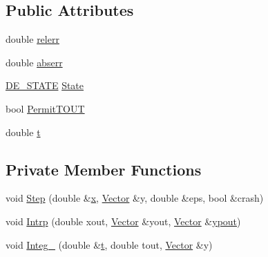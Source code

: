 \subsection*{Public Attributes}
\begin{DoxyCompactItemize}
\item 
double \hyperlink{classDE_a877edbd8bd4ba297b5602786b552059f}{relerr}
\item 
double \hyperlink{classDE_a9337b177c5adfeda779ceecd6b56b370}{abserr}
\item 
\hyperlink{SAT__DE_8h_a57a5a4efb7b7add9bd828d85d9bb920d}{D\-E\-\_\-\-S\-T\-A\-T\-E} \hyperlink{classDE_a1d99a54650b09e8192bf89537f66bed2}{State}
\item 
bool \hyperlink{classDE_ab4adac8a112f4c5b5600986b418e5129}{Permit\-T\-O\-U\-T}
\item 
double \hyperlink{classDE_a56ee5af65170db9321a5508c207cd173}{t}
\end{DoxyCompactItemize}
\subsection*{Private Member Functions}
\begin{DoxyCompactItemize}
\item 
void \hyperlink{classDE_ac45486f7c7bf422c6bd024aba501a2a2}{Step} (double \&\hyperlink{classDE_a53686f8f7ab89225ba80835e910168fa}{x}, \hyperlink{classVector}{Vector} \&y, double \&eps, bool \&crash)
\item 
void \hyperlink{classDE_a6437bef70b2bb04c1b041e6ea86665ad}{Intrp} (double xout, \hyperlink{classVector}{Vector} \&yout, \hyperlink{classVector}{Vector} \&\hyperlink{classDE_a985edfb71c582371040affbd4230a36a}{ypout})
\item 
void \hyperlink{classDE_ac5af669df33d23002a4744f0217e33dc}{Integ\-\_\-} (double \&\hyperlink{classDE_a56ee5af65170db9321a5508c207cd173}{t}, double tout, \hyperlink{classVector}{Vector} \&y)
\end{DoxyCompactItemize}
